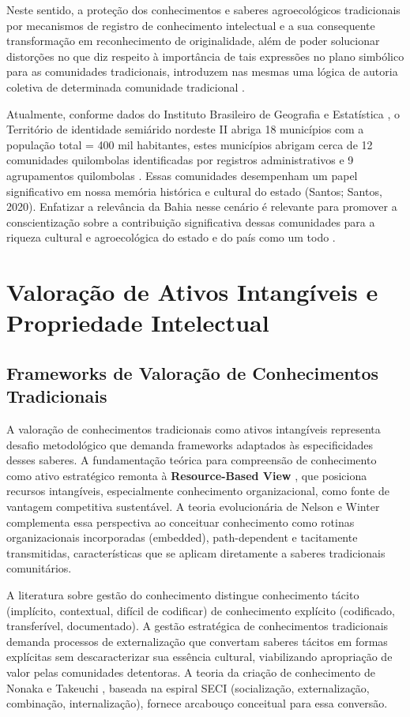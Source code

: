 Neste sentido, a proteção dos conhecimentos e saberes agroecológicos tradicionais por mecanismos de registro de conhecimento intelectual e a sua consequente transformação em reconhecimento de originalidade, além de poder solucionar distorções no que diz respeito à importância de tais expressões no plano simbólico para as comunidades tradicionais, introduzem nas mesmas uma lógica de autoria coletiva de determinada comunidade tradicional \cite{LimaVerdanRangel2018}.

Atualmente, conforme dados do Instituto Brasileiro de Geografia e Estatística \cite{IBGE2010}, o Território de identidade semiárido nordeste II abriga 18 municípios com a população total = 400 mil habitantes, estes municípios abrigam cerca de 12 comunidades quilombolas identificadas por registros administrativos e 9 agrupamentos quilombolas \cite{IBGE2022}. Essas comunidades desempenham um papel significativo em nossa memória histórica e cultural do estado (Santos; Santos, 2020). Enfatizar a relevância da Bahia nesse cenário é relevante para promover a conscientização sobre a contribuição significativa dessas comunidades para a riqueza cultural e agroecológica do estado e do país como um todo \cite{Lima2010}.


\section{Valoração de Ativos Intangíveis e Propriedade Intelectual}

\subsection{Frameworks de Valoração de Conhecimentos Tradicionais}

A valoração de conhecimentos tradicionais como ativos intangíveis representa desafio metodológico que demanda frameworks adaptados às especificidades desses saberes. A fundamentação teórica para compreensão de conhecimento como ativo estratégico remonta à \textbf{Resource-Based View} \cite{Penrose1959,Barney1991}, que posiciona recursos intangíveis, especialmente conhecimento organizacional, como fonte de vantagem competitiva sustentável. A teoria evolucionária de Nelson e Winter \cite{Nelson1982} complementa essa perspectiva ao conceituar conhecimento como rotinas organizacionais incorporadas (embedded), path-dependent e tacitamente transmitidas, características que se aplicam diretamente a saberes tradicionais comunitários.

A literatura sobre gestão do conhecimento \cite{Nonaka1995,Grant1996} distingue conhecimento tácito (implícito, contextual, difícil de codificar) de conhecimento explícito (codificado, transferível, documentado). A gestão estratégica de conhecimentos tradicionais demanda processos de externalização que convertam saberes tácitos em formas explícitas sem descaracterizar sua essência cultural, viabilizando apropriação de valor pelas comunidades detentoras. A teoria da criação de conhecimento de Nonaka e Takeuchi \cite{Nonaka1995}, baseada na espiral SECI (socialização, externalização, combinação, internalização), fornece arcabouço conceitual para essa conversão.

